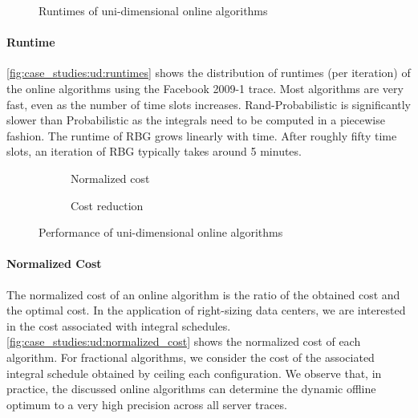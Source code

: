 \begin{figure}
    \begin{subfigure}[b]{.5\linewidth}
    \resizebox{\textwidth}{!}{}
    \end{subfigure}
    \begin{subfigure}[b]{.5\linewidth}
    \resizebox{\textwidth}{!}{}
    \end{subfigure}
    \caption{Runtimes of uni-dimensional online algorithms}\label{fig:case_studies:ud:runtimes}
\end{figure}

\paragraph{Runtime} \autoref{fig:case_studies:ud:runtimes} shows the distribution of runtimes (per iteration) of the online algorithms using the Facebook 2009-1 trace. Most algorithms are very fast, even as the number of time slots increases. Rand-Probabilistic is significantly slower than Probabilistic as the integrals need to be computed in a piecewise fashion. The runtime of RBG grows linearly with time. After roughly fifty time slots, an iteration of RBG typically takes around 5 minutes.

\begin{figure}
    \begin{subfigure}[b]{.5\linewidth}
    \resizebox{\textwidth}{!}{}
    \caption{Normalized cost}\label{fig:case_studies:ud:normalized_cost}
    \end{subfigure}
    \begin{subfigure}[b]{.5\linewidth}
    \resizebox{\textwidth}{!}{}
    \caption{Cost reduction}\label{fig:case_studies:ud:cost_reduction}
    \end{subfigure}
    \caption{Performance of uni-dimensional online algorithms}
\end{figure}

\paragraph{Normalized Cost} The normalized cost of an online algorithm is the ratio of the obtained cost and the optimal cost. In the application of right-sizing data centers, we are interested in the cost associated with integral schedules. \autoref{fig:case_studies:ud:normalized_cost} shows the normalized cost of each algorithm. For fractional algorithms, we consider the cost of the associated integral schedule obtained by ceiling each configuration. We observe that, in practice, the discussed online algorithms can determine the dynamic offline optimum to a very high precision across all server traces.

